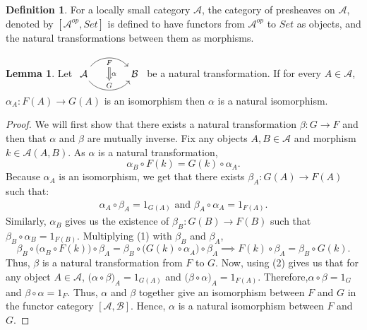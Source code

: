 \documentclass[a4paper]{article}
\theoremstyle{definition}
\newtheorem{definition}[theorem]{Definition}
\newtheorem{lemma}[theorem]{Lemma}
\begin{document}
	\begin{definition} %
		For a locally small category $\mathcal{A} $, the category of presheaves on $\mathcal{A} $, denoted by $[\mathcal{A} ^{op},Set]$
		is defined to have functors from $\mathcal{A} ^{op}$ to $Set$ as objects,
		and the natural transformations between them as morphisms.
	\end{definition}
	\begin{lemma}
		Let $ 	\begin{tikzcd}[row sep=small, column sep=large]
			\mathcal{A}  \arrow[r,bend left=50, "F"{name=U, below}]
			\arrow[r, bend right = 50, "G"{name=D, above}]
		& \mathcal{B}
		\arrow[Rightarrow, from=U , to=D, "\alpha"]
		\end{tikzcd}$
		be a natural transformation. If for every $A \in \mathcal{A} $,
		$\alpha_A:F(A) \to G(A)$ is an isomorphism
		then $\alpha$ is a natural isomorphism.
	\end{lemma}
	\begin{proof}\setcounter{equation}{0}
		We will first show that there exists a natural transformation $\beta:G \to F$
		and then that $\alpha$ and $\beta$ are mutually inverse.
		Fix any objects $A,B\in \mathcal{A} $ and morphism $k \in \mathcal{A}(A,B)$. As
		$\alpha$ is a natural transformation,
		\begin{equation}
			\alpha_B \circ F(k) = G(k) \circ \alpha_A.
		\end{equation}
		Because $\alpha_A$ is an isomorphism, we get that
		there exists
		$\beta_A:G(A)\to F(A)$ such that:
		\begin{align}
			\alpha_A \circ \beta_A = 1_{G(A)} \text{ and }
			\beta_A \circ \alpha_A = 1_{F(A)}.
		\end{align}
		Similarly, $\alpha_B$ gives us the existence of $\beta_B:G(B)\to F(B)$
		such that $\beta_B \circ \alpha_B = 1_{F(B)}$. Multiplying (1) with $\beta_B$ and
		$\beta_A$,
		\begin{equation}
			\beta_B^{} \circ \big( \alpha_B^{} \circ F(k) \big) \circ \beta_A^{} =
			\beta_B^{} \circ \big( G(k) \circ \alpha_A^{} \big) \circ \beta_A^{}
			\implies  F(k) \circ \beta_A^{} =\beta_B^{} \circ G(k).
		\end{equation}
		Thus, $\beta$ is a natural transformation from $F$ to $G$. Now, using (2) gives us
		that for any object $A\in \mathcal{A} $, $\big( \alpha \circ \beta \big)_A = 1_{G(A)}$ and
		$\big( \beta \circ \alpha \big)_A = 1_{F(A)}$.
		Therefore,$\alpha \circ \beta = 1_G$ and $\beta \circ \alpha =1_F$.
		Thus, $\alpha$ and $\beta$ together give an isomorphism between $F$ and $G$
		in the functor category
		$[\mathcal{A},\mathcal{B}]$. Hence, $\alpha$ is a natural isomorphism between $F$
		and $G$.
	\end{proof}
\end{document}
